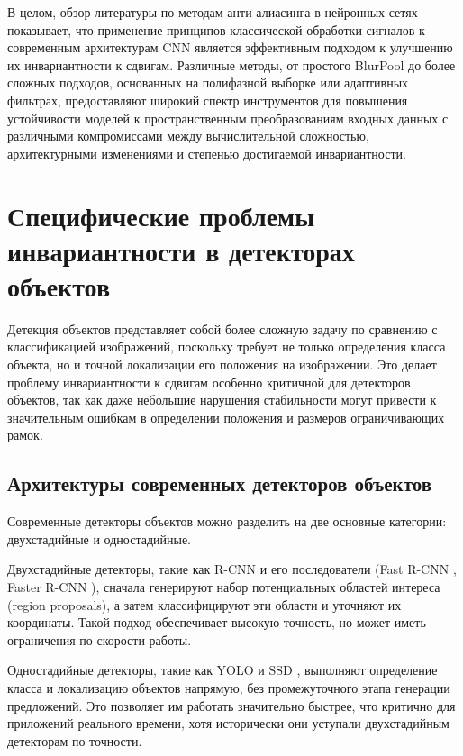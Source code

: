 В целом, обзор литературы по методам анти-алиасинга в нейронных сетях показывает, что применение принципов классической обработки сигналов к современным архитектурам CNN является эффективным подходом к улучшению их инвариантности к сдвигам. Различные методы, от простого BlurPool до более сложных подходов, основанных на полифазной выборке или адаптивных фильтрах, предоставляют широкий спектр инструментов для повышения устойчивости моделей к пространственным преобразованиям входных данных с различными компромиссами между вычислительной сложностью, архитектурными изменениями и степенью достигаемой инвариантности.

\section{Специфические проблемы инвариантности в детекторах объектов}
\label{review:detectors}

Детекция объектов представляет собой более сложную задачу по сравнению с классификацией изображений, поскольку требует не только определения класса объекта, но и точной локализации его положения на изображении. Это делает проблему инвариантности к сдвигам особенно критичной для детекторов объектов, так как даже небольшие нарушения стабильности могут привести к значительным ошибкам в определении положения и размеров ограничивающих рамок.

\subsection{Архитектуры современных детекторов объектов}
\label{review:detectors:architectures}

Современные детекторы объектов можно разделить на две основные категории: двухстадийные и одностадийные.

Двухстадийные детекторы, такие как R-CNN \cite{Girshick2014} и его последователи (Fast R-CNN \cite{Girshick2015}, Faster R-CNN \cite{Ren2015}), сначала генерируют набор потенциальных областей интереса (region proposals), а затем классифицируют эти области и уточняют их координаты. Такой подход обеспечивает высокую точность, но может иметь ограничения по скорости работы.

Одностадийные детекторы, такие как YOLO \cite{Redmon2016} и SSD \cite{Liu2016}, выполняют определение класса и локализацию объектов напрямую, без промежуточного этапа генерации предложений. Это позволяет им работать значительно быстрее, что критично для приложений реального времени, хотя исторически они уступали двухстадийным детекторам по точности.

